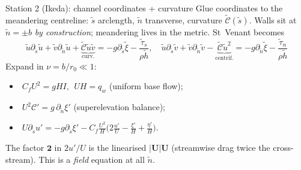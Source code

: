 \documentclass[aspectratio=169,10pt]{beamer}
\newcommand{\ds}{\partial_{\tilde s}}
\begin{document}
\begin{frame}{Station 2 (Ikeda): channel coordinates + curvature}
Glue coordinates to the meandering centreline: $\tilde s$ arclength, $\tilde n$
transverse, curvature $\tilde{\mathscr C}(\tilde s)$. Walls sit at $\tilde n=\pm b$
\emph{by construction}; meandering lives in the metric. St~Venant becomes
\[
\tilde u\ds\tilde u+\tilde v\partial_{\tilde n}\tilde u+\underbrace{\tilde{\mathscr C}\tilde u\tilde v}_{\text{curv.}}=-g\ds\tilde\xi-\frac{\tilde\tau_s}{\rho\tilde h},\quad
\tilde u\ds\tilde v+\tilde v\partial_{\tilde n}\tilde v-\underbrace{\tilde{\mathscr C}\tilde u^2}_{\text{centrif.}}=-g\partial_{\tilde n}\tilde\xi-\frac{\tilde\tau_n}{\rho\tilde h}
\]
Expand in $\nu=b/r_0\ll1$:
\begin{itemize}\footnotesize
  \item[$O(1)$:] $\;C_fU^2=gHI,\ \ UH=q_w$ (uniform base flow);
  \item[$O(\nu)$:] $\;U^2\mathscr C'=g\,\partial_{\tilde n}\xi'$ \hfill (superelevation balance);
  \item[$O(\nu^2)$:] $\;U\ds u'=-g\ds\xi'-C_f\tfrac{U^2}{H}\big(2\tfrac{u'}{U}-\tfrac{\xi'}{H}+\tfrac{\eta'}{H}\big).$
\end{itemize}
\footnotesize The factor $\mathbf 2$ in $2u'/U$ is the linearised $|\mathbf U|\mathbf U$ (streamwise drag twice the cross-stream). This is a \emph{field} equation at all $\tilde n$.
\end{frame}
\end{document}
